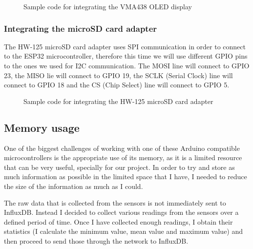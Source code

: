 \documentclass[12pt]{article}
\begin{document}
\begin{figure}[h]
\label{code:oled}

\centering
\caption{Sample code for integrating the VMA438 OLED display}
\end{figure}

\subsubsection{Integrating the microSD card adapter}

The HW-125 microSD card adapter uses SPI communication in order to connect to the ESP32 microcontroller, therefore this time we will use different GPIO pins to the ones we used for I2C communication. The MOSI line will connect to GPIO 23, the MISO lie will connect to GPIO 19, the SCLK (Serial Clock) line will connect to GPIO 18 and the CS (Chip Select) line will connect to GPIO 5.

\begin{figure}[h]
\label{code:sd}

\centering
\caption{Sample code for integrating the HW-125 microSD card adapter}
\end{figure}

\subsection{Memory usage}

One of the biggest challenges of working with one of these Arduino compatible microcontrollers is the appropriate use of its memory, as it is a limited resource that can be very useful, specially for our project. In order to try and store as much information as possible in the limited space that I have, I needed to reduce the size of the information as much as I could.\par

The raw data that is collected from the sensors is not immediately sent to InfluxDB. Instead I decided to collect various readings from the sensors over a defined period of time. Once I have collected enough readings, I obtain their statistics (I calculate the minimum value, mean value and maximum value) and then proceed to send those through the network to InfluxDB.\par 
\end{document}
